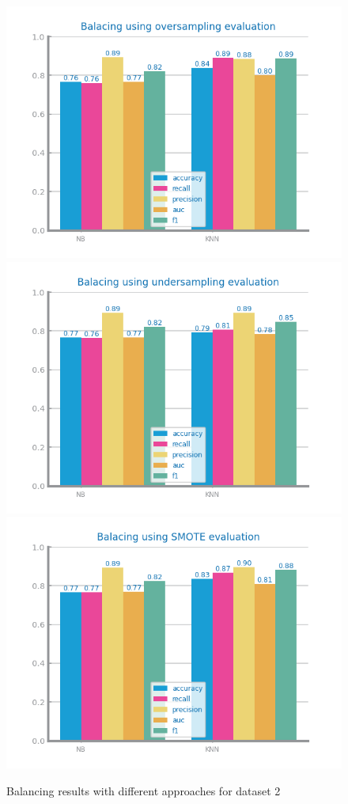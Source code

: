 \documentclass[10pt]{extarticle}
\begin{document}
\begin{figure}[H]
\centering\includegraphics[scale=0.80]{images/dataset2/data_preparation/Credit_Score_balancing_oversampling.png}
\includegraphics[scale=0.80]{images/dataset2/data_preparation/Credit_Score_balancing_undersampling.png}
\includegraphics[scale=0.80]{images/dataset2/data_preparation/Credit_Score_balancing_SMOTE.png}
\caption{Balancing results with different approaches for dataset 2}
\end{figure}
\end{document}
